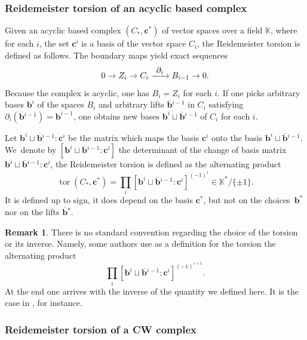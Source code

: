 \documentclass[10pt]{amsart}
\newcommand\To[1]{\mathchoice{\xrightarrow{\textstyle\kern4pt#1\kern3pt}}{\stackrel{#1}{\longrightarrow}}{}{}}
\theoremstyle{plain}
\theoremstyle{definition}
\newtheorem{rmrk}[thm]{Remark}
\theoremstyle{remark}
\newcommand{\K}{\mathbb{K}}
\numberwithin{equation}{section}
\DeclareMathOperator{\tor}{tor}
\begin{document}
\subsubsection{Reidemeister torsion of an acyclic based complex}

Given an acyclic based complex $(C_*, \boldsymbol{c}^*)$ of vector spaces over a field $\K$, where for each $i$, the set $\boldsymbol{c}^i$ is a basis of the vector space $C_i$, the Reidemeister torsion is defined as follows.
The boundary maps yield exact sequences
\[
0 \to Z_i \to C_i \To{\partial_i} B_{i-1} \to 0.
\]
Because the complex is acyclic, one has $B_i = Z_i$ for each $i$. If one picks arbitrary bases $\boldsymbol{b}^i$ of the spaces $B_i$ and arbitrary lifts $\boldsymbol{\overline b}{}^{i-1}$ in $C_{i}$ satisfying $\partial_i(\boldsymbol{\overline b}{}^{i-1}) =\boldsymbol{b}^{i-1}$, one obtains new bases $\boldsymbol{b}^i \sqcup \boldsymbol{\overline b}{}^{i-1}$ of $C_i$ for each $i$.

Let $\boldsymbol{b}^i \sqcup \boldsymbol{\overline b}{}^{i-1} \colon \boldsymbol{c}^i$ be the matrix which maps the basis $\boldsymbol c^i$ onto the basis $\boldsymbol{b}^i \sqcup \boldsymbol{\overline b}{}^{i-1}$.
We~denote by $[\boldsymbol{b}^i \sqcup \boldsymbol{\overline b}{}^{i-1} \colon \boldsymbol{c}^i]$ the determinant of the change of basis matrix $\boldsymbol{b}^i \sqcup \boldsymbol{\overline b}{}^{i-1} \colon \boldsymbol{c}^i$, the Reidemeister torsion is defined as the alternating product
\[
\tor(C_*, \boldsymbol{c}^*) = \prod_i [\boldsymbol{b}^i \sqcup \boldsymbol{\overline b}{}^{i-1} \colon \boldsymbol{c}^i]^{(-1)^i} \in \K^* / \{\pm 1\}.
\]
It is defined up to sign, it does depend on the basis $\boldsymbol{c}^*$, but not on the choices~$\boldsymbol{b}^*$ nor on the lifts $\boldsymbol{\overline b}{}^*$.

\begin{rmrk}
\label{rmk:convention}
There is no standard convention regarding the choice of the torsion or its inverse. Namely, some authors use as a definition for the torsion the alternating product
\[
\prod_i [\boldsymbol{b}^i \sqcup \boldsymbol{\overline b}{}^{i-1} \colon \boldsymbol{c}^i]^{(-1)^{i+1}}.
\]
At the end one arrives with the inverse of the quantity we defined here. It is the case in \cite{fried1986fuchsian}, for instance.
\end{rmrk}
\subsubsection{Reidemeister torsion of a CW complex}
\end{document}
